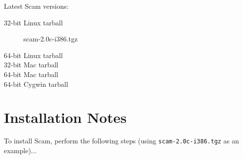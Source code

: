 \documentclass{article}
\begin{document}
Latest Scam versions:

\begin{description}
    \item[32-bit Linux tarball]
         {scam-2.0c-i386.tgz}
    \item[64-bit Linux tarball]
    \item[32-bit Mac tarball]
    \item[64-bit Mac tarball]
    \item[64-bit Cygwin tarball]
\end{description}

%
%


\section*{Installation Notes}

To install Scam, perform the following steps
(using {\tt scam-2.0c-i386.tgz} as an example)...
\end{document}
